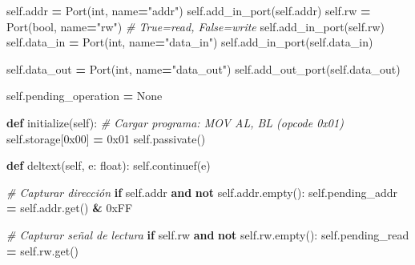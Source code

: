 \documentclass[12pt,oneside]{templates/unerthesis}
\newenvironment{Shaded}{\begin{snugshade}}{\end{snugshade}}
\newcommand{\BaseNTok}[1]{\textcolor[rgb]{0.00,0.00,0.81}{#1}}
\newcommand{\BuiltInTok}[1]{#1}
\newcommand{\CommentTok}[1]{\textcolor[rgb]{0.56,0.35,0.01}{\textit{#1}}}
\newcommand{\ControlFlowTok}[1]{\textcolor[rgb]{0.13,0.29,0.53}{\textbf{#1}}}
\newcommand{\KeywordTok}[1]{\textcolor[rgb]{0.13,0.29,0.53}{\textbf{#1}}}
\newcommand{\NormalTok}[1]{#1}
\newcommand{\OperatorTok}[1]{\textcolor[rgb]{0.81,0.36,0.00}{\textbf{#1}}}
\newcommand{\StringTok}[1]{\textcolor[rgb]{0.31,0.60,0.02}{#1}}
\newcommand{\VariableTok}[1]{\textcolor[rgb]{0.00,0.00,0.00}{#1}}
\begin{document}
\begin{Shaded}
\begin{Highlighting}[]
        \VariableTok{self}\NormalTok{.addr }\OperatorTok{=}\NormalTok{ Port(}\BuiltInTok{int}\NormalTok{, name}\OperatorTok{=}\StringTok{"addr"}\NormalTok{)}
        \VariableTok{self}\NormalTok{.add\_in\_port(}\VariableTok{self}\NormalTok{.addr)}
        \VariableTok{self}\NormalTok{.rw }\OperatorTok{=}\NormalTok{ Port(}\BuiltInTok{bool}\NormalTok{, name}\OperatorTok{=}\StringTok{"rw"}\NormalTok{)  }\CommentTok{\# True=read, False=write}
        \VariableTok{self}\NormalTok{.add\_in\_port(}\VariableTok{self}\NormalTok{.rw)}
        \VariableTok{self}\NormalTok{.data\_in }\OperatorTok{=}\NormalTok{ Port(}\BuiltInTok{int}\NormalTok{, name}\OperatorTok{=}\StringTok{"data\_in"}\NormalTok{)}
        \VariableTok{self}\NormalTok{.add\_in\_port(}\VariableTok{self}\NormalTok{.data\_in)}
        
        \VariableTok{self}\NormalTok{.data\_out }\OperatorTok{=}\NormalTok{ Port(}\BuiltInTok{int}\NormalTok{, name}\OperatorTok{=}\StringTok{"data\_out"}\NormalTok{)}
        \VariableTok{self}\NormalTok{.add\_out\_port(}\VariableTok{self}\NormalTok{.data\_out)}
        
        \VariableTok{self}\NormalTok{.pending\_operation }\OperatorTok{=} \VariableTok{None}
    
    \KeywordTok{def}\NormalTok{ initialize(}\VariableTok{self}\NormalTok{):}
        \CommentTok{\# Cargar programa: MOV AL, BL (opcode 0x01)}
        \VariableTok{self}\NormalTok{.storage[}\BaseNTok{0x00}\NormalTok{] }\OperatorTok{=} \BaseNTok{0x01}
        \VariableTok{self}\NormalTok{.passivate()}
    
    \KeywordTok{def}\NormalTok{ deltext(}\VariableTok{self}\NormalTok{, e: }\BuiltInTok{float}\NormalTok{):}
        \VariableTok{self}\NormalTok{.continuef(e)}
        
        \CommentTok{\# Capturar dirección}
        \ControlFlowTok{if} \VariableTok{self}\NormalTok{.addr }\KeywordTok{and} \KeywordTok{not} \VariableTok{self}\NormalTok{.addr.empty():}
            \VariableTok{self}\NormalTok{.pending\_addr }\OperatorTok{=} \VariableTok{self}\NormalTok{.addr.get() }\OperatorTok{\&} \BaseNTok{0xFF}
        
        \CommentTok{\# Capturar señal de lectura}
        \ControlFlowTok{if} \VariableTok{self}\NormalTok{.rw }\KeywordTok{and} \KeywordTok{not} \VariableTok{self}\NormalTok{.rw.empty():}
            \VariableTok{self}\NormalTok{.pending\_read }\OperatorTok{=} \VariableTok{self}\NormalTok{.rw.get()}
        

\end{Highlighting}
\end{Shaded}
\end{document}
